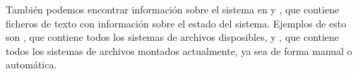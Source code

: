También podemos encontrar información sobre el sistema en  y , que contiene ficheros de texto con información sobre el estado del sistema.
Ejemplos de esto son , que contiene todos los sistemas de archivos disposibles, y , que contiene todos los sistemas de archivos montados actualmente, ya sea de forma manual o automática.

